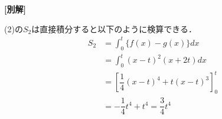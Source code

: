 \documentclass[../../main.tex]{subfiles}
\begin{document}
{\bf [別解]}

(2)の$S_2$は直接積分すると以下のように検算できる．
\begin{align}
  S_2
  &= \int_0^t \{ f(x) - g(x) \} dx \\
  &= \int_0^t (x-t)^2 (x+2t) dx \\
  &= \left[ \dfrac{1}{4} (x-t)^4 + t (x-t)^3 \right]_0^t \\
  &= -\dfrac{1}{4} t^4 + t^4 = \dfrac{3}{4} t^4
\end{align}
\end{document}
